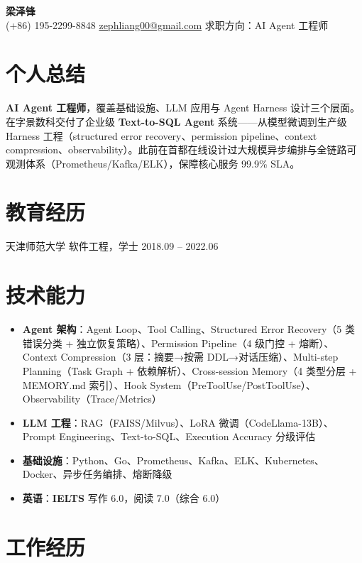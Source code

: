 \documentclass[10pt, a4paper]{article}
\begin{document}
\begin{center}
  {\LARGE\bfseries 梁泽锋}\\[0.12em]
  {\small (+86) 195-2299-8848 \quad \href{mailto:zephliang00@gmail.com}{zephliang00@gmail.com} \quad 求职方向：AI Agent 工程师}
\end{center}

\vspace{0.2em}

\section{个人总结}
\noindent\textbf{AI Agent 工程师}，覆盖基础设施、LLM 应用与 Agent Harness 设计三个层面。在字景数科交付了企业级 \textbf{Text-to-SQL Agent} 系统——从模型微调到生产级 Harness 工程（structured error recovery、permission pipeline、context compression、observability）。此前在首都在线设计过大规模异步编排与全链路可观测体系（Prometheus/Kafka/ELK），保障核心服务 99.9\% SLA。

\section{教育经历}
\noindent 天津师范大学 \textbar{} 软件工程，学士 \hfill 2018.09 -- 2022.06

\section{技术能力}
\begin{itemize}
  \item \textbf{Agent 架构}：Agent Loop、Tool Calling、Structured Error Recovery（5 类错误分类 + 独立恢复策略）、Permission Pipeline（4 级门控 + 熔断）、Context Compression（3 层：摘要→按需 DDL→对话压缩）、Multi-step Planning（Task Graph + 依赖解析）、Cross-session Memory（4 类型分层 + MEMORY.md 索引）、Hook System（PreToolUse/PostToolUse）、Observability（Trace/Metrics）
  \item \textbf{LLM 工程}：RAG（FAISS/Milvus）、LoRA 微调（CodeLlama-13B）、Prompt Engineering、Text-to-SQL、Execution Accuracy 分级评估
  \item \textbf{基础设施}：Python、Go、Prometheus、Kafka、ELK、Kubernetes、Docker、异步任务编排、熔断降级
  \item \textbf{英语}：\textbf{IELTS} 写作 6.0，阅读 7.0（综合 6.0）
\end{itemize}

\section{工作经历}
\end{document}
